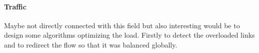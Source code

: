 \documentclass{article}
\theoremstyle{remark}
\begin{document}
\paragraph{Traffic} Maybe not directly connected with this field but also interesting would be to design some algorithms optimizing the load. Firstly to detect the overloaded links and to redirect the  flow so that it was balanced globally.



\end{document}
